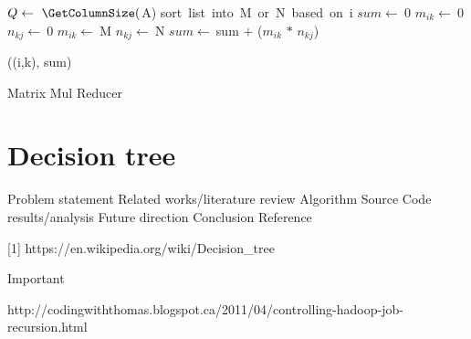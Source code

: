\documentclass{article}
\begin{document}
\IncMargin{1em}
\begin{algorithm}[H]
\DontPrintSemicolon
{}
\BlankLine
$Q\leftarrow\ \GetColumnSize($A)\;
sort\ list\ into\ M\ or\ N\ based\ on\ i\;
$sum\leftarrow\ $0\;
 {
	$m_{ik}\leftarrow\ $0\;
	$n_{kj}\leftarrow\ $0\;
	 {
		$m_{ik}\leftarrow\ $M\big[K\big]
	}
	 {
		$n_{kj}\leftarrow\ $N\big[K\big]
	}
	$sum\leftarrow\ $sum $+$ ($m_{ik}$ $*$ $n_{kj}$)
}

\emit((i,k), sum)

\caption{Matrix Mul Reducer\label{IR}}
\end{algorithm}
\DecMargin{1em}

\section{Decision tree}

Problem statement
Related works/literature review
Algorithm
Source Code
results/analysis
Future direction
Conclusion
Reference


[1] https://en.wikipedia.org/wiki/Decision\_tree

Important

http://codingwiththomas.blogspot.ca/2011/04/controlling-hadoop-job-recursion.html
\end{document}
